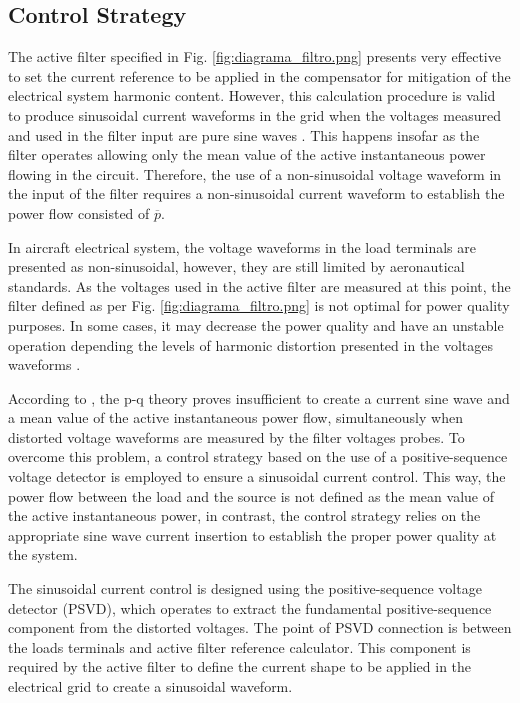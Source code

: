 
\subsection{Control Strategy}

The active filter specified in Fig. \ref{fig:diagrama_filtro.png} presents very effective to set the current reference to be applied in the compensator for mitigation of the electrical system harmonic content. However, this calculation procedure is valid to produce sinusoidal current waveforms in the grid when the voltages measured and used in the filter input are pure sine waves \citep{Akagi2007}. This happens insofar as the filter operates allowing only the mean value of the active instantaneous power flowing in the circuit. Therefore, the use of a non-sinusoidal voltage waveform in the input of the filter requires a non-sinusoidal current waveform to establish the power flow consisted of $\overline{p}$.

In aircraft electrical system, the voltage waveforms in the load terminals are presented as non-sinusoidal, however, they are still limited by aeronautical standards. As the voltages used in the active filter are measured at this point, the filter defined as per Fig. \ref{fig:diagrama_filtro.png} is not optimal for power quality purposes. In some cases, it may decrease the power quality and have an unstable operation depending the levels of harmonic distortion presented in the voltages waveforms \citep{Akagi2007}.

According to \citep{Akagi2007}, the p-q theory proves insufficient to create a current sine wave and a mean value of the active instantaneous power flow, simultaneously when distorted voltage waveforms are measured by the filter voltages probes. To overcome this problem, a control strategy based on the use of a positive-sequence voltage detector is employed to ensure a sinusoidal current control. This way, the power flow between the load and the source is not defined as the mean value of the active instantaneous power, in contrast, the control strategy relies on the appropriate sine wave current insertion to establish the proper power quality at the system.

The sinusoidal current control is designed using the positive-sequence voltage detector (PSVD), which operates to extract the fundamental positive-sequence component from the distorted voltages. The point of PSVD connection is between the loads terminals and active filter reference calculator. This component is required by the active filter to define the current shape to be applied in the electrical grid to create a sinusoidal waveform. 


